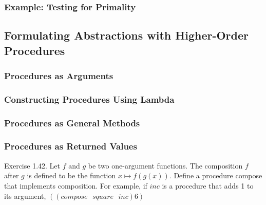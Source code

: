             \subsubsection{Example: Testing for Primality}
        \subsection{Formulating Abstractions with Higher-Order Procedures}
            \subsubsection{Procedures as Arguments}
            \subsubsection{Constructing Procedures Using Lambda}
            \subsubsection{Procedures as General Methods}
            \subsubsection{Procedures as Returned Values}
Exercise 1.42. Let $f$ and $g$ be two one-argument functions. The composition $f$ after $g$ is defined to be the function $x \mapsto f\left(g\left(x\right)\right)$. Define a procedure compose that implements composition. For example, if $inc$ is a procedure that adds 1 to its argument, $\left(\left(compose\mbox{ }square\mbox{ }inc\right) 6\right)$


